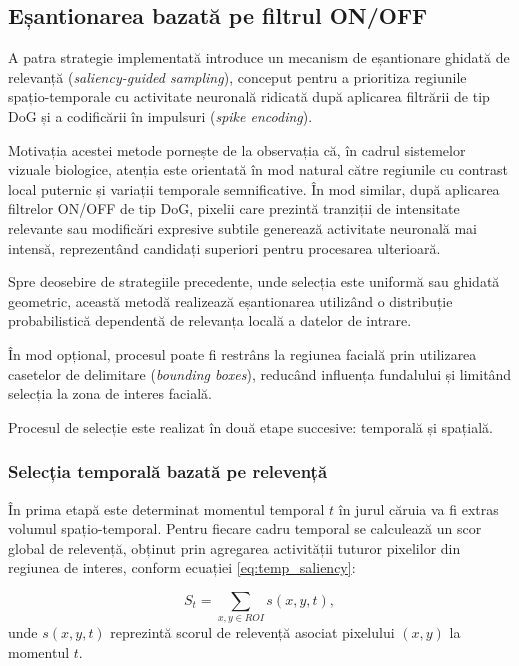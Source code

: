 \subsection*{Eșantionarea bazată pe filtrul ON/OFF}

A patra strategie implementată introduce un mecanism de eșantionare ghidată de relevanță (\textit{saliency-guided sampling}), conceput pentru a prioritiza regiunile spațio-temporale cu activitate neuronală ridicată după aplicarea filtrării de tip DoG și a codificării în impulsuri (\textit{spike encoding}).

Motivația acestei metode pornește de la observația că, în cadrul sistemelor vizuale biologice, atenția este orientată în mod natural către regiunile cu contrast local puternic și variații temporale semnificative. În mod similar, după aplicarea filtrelor ON/OFF de tip DoG, pixelii care prezintă tranziții de intensitate relevante sau modificări expresive subtile generează activitate neuronală mai intensă, reprezentând candidați superiori pentru procesarea ulterioară.

Spre deosebire de strategiile precedente, unde selecția este uniformă sau ghidată geometric, această metodă realizează eșantionarea utilizând o distribuție probabilistică dependentă de relevanța locală a datelor de intrare.

În mod opțional, procesul poate fi restrâns la regiunea facială prin utilizarea casetelor de delimitare (\textit{bounding boxes}), reducând influența fundalului și limitând selecția la zona de interes facială.

Procesul de selecție este realizat în două etape succesive: temporală și spațială.

\subsubsection{Selecția temporală bazată pe relevență}

În prima etapă este determinat momentul temporal $t$ în jurul căruia va fi extras volumul spațio-temporal. Pentru fiecare cadru temporal se calculează un scor global de relevență, obținut prin agregarea activității tuturor pixelilor din regiunea de interes, conform ecuației \eqref{eq:temp_saliency}:

\begin{equation}
	\label{eq:temp_saliency}
	S_t = \sum_{x,y \in ROI} s(x,y,t),
\end{equation}
unde $s(x,y,t)$ reprezintă scorul de relevență asociat pixelului $(x,y)$ la momentul $t$.

